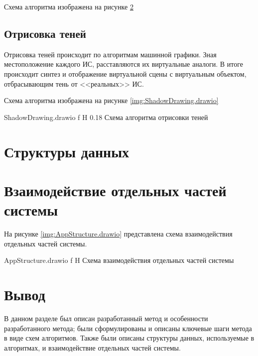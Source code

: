 Схема алгоритма изображена на рисунке \ref{}


\subsection{Отрисовка теней}

Отрисовка теней происходит по алгоритмам машинной графики. Зная местоположение каждого ИС, расставляются их виртуальные аналоги. В итоге происходит синтез и отображение виртуальной сцены с виртуальным объектом, отбрасывающим тень от <<реальных>> ИС.

Схема алгоритма изображена на рисунке \ref{img:ShadowDrawing.drawio}

{ShadowDrawing.drawio}
{f}
{H}
{0.18\textwidth}
{Схема алгоритма отрисовки теней}

\section{Структуры данных}



\section{Взаимодействие отдельных частей системы}

На рисунке \ref{img:AppStructure.drawio} представлена схема взаимодействия отдельных частей системы.

{AppStructure.drawio}
{f}
{H}
{\textwidth}
{Схема взаимодействия отдельных частей системы}

\section*{Вывод}

В данном разделе был описан разработанный метод и особенности разработанного метода; были сформулированы и описаны ключевые шаги метода в виде схем алгоритмов. Также были описаны структуры данных, используемые в алгоритмах, и взаимодействие отдельных частей системы.